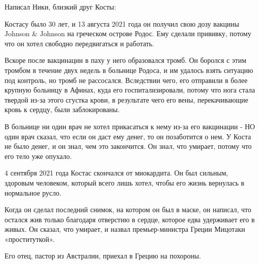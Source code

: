 Написал Ники, близкий друг Косты:

Костасу было 30 лет, и 13 августа 2021 года он получил свою дозу вакцины Johnson
\& Johnson на греческом острове Родос. Ему сделали прививку, потому что он хотел
свободно передвигаться и работать.

Вскоре после вакцинации в паху у него образовался тромб. Он боролся с этим
тромбом в течение двух недель в больнице Родоса, и им удалось взять ситуацию под
контроль, но тромб не рассосался. Вследствии чего, его отправили в более крупную
больницу в Афинах, куда его госпитализировали, потому что нога стала твердой
из-за этого сгустка крови, в результате чего его вены, перекачивающие кровь к
сердцу, были заблокированы.

В больнице ни один врач не хотел прикасаться к нему из-за его вакцинации - НО
один врач сказал, что если он даст ему денег, то он позаботится о нем. У Коста
не было денег, и он знал, чем это закончится. Он знал, что умирает, потому что
его тело уже опухало.

4 сентября 2021 года Костас скончался от миокардита. Он был сильным, здоровым
человеком, который всего лишь хотел, чтобы его жизнь вернулась в нормальное
русло.

Когда он сделал последний снимок, на котором он был в маске, он написал, что
остался жив только благодаря отверстию в сердце, которое едва удерживает его в
живых. Он сказал, что умирает, и назвал премьер-министра Греции Мицотаки
«проституткой».

Его отец, пастор из Австралии, приехал в Грецию на похороны.
